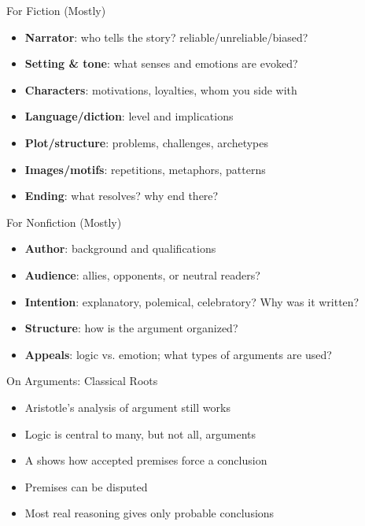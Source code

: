 \documentclass[aspectratio=169]{beamer}
\begin{document}
\begin{frame}{For Fiction (Mostly)}
\begin{itemize}
  \item \textbf{Narrator}: who tells the story? reliable/unreliable/biased?
  \item \textbf{Setting \& tone}: what senses and emotions are evoked?
  \item \textbf{Characters}: motivations, loyalties, whom you side with
  \item \textbf{Language/diction}: level and implications
  \item \textbf{Plot/structure}: problems, challenges, archetypes
  \item \textbf{Images/motifs}: repetitions, metaphors, patterns
  \item \textbf{Ending}: what resolves? why end there?
\end{itemize}
\end{frame}

\begin{frame}{For Nonfiction (Mostly)}
\begin{itemize}
  \item \textbf{Author}: background and qualifications
  \item \textbf{Audience}: allies, opponents, or neutral readers?
  \item \textbf{Intention}: explanatory, polemical, celebratory? Why was it written?
  \item \textbf{Structure}: how is the argument organized?
  \item \textbf{Appeals}: logic vs. emotion; what types of arguments are used?
\end{itemize}
\end{frame}

\begin{frame}{On Arguments: Classical Roots}
\begin{itemize}
  \item Aristotle's analysis of argument still works
  \item Logic is central to many, but not all, arguments
  \item A  shows how accepted premises force a conclusion
  \item Premises can be disputed
  \item Most real reasoning gives only probable conclusions
\end{itemize}
\end{frame}
\end{document}
